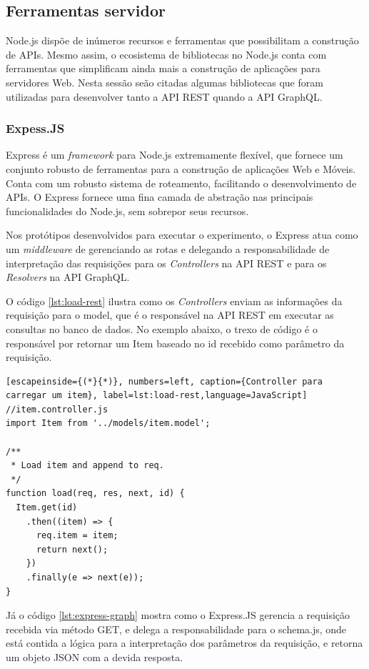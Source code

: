 \subsection{Ferramentas servidor}

Node.js dispõe de inúmeros recursos e ferramentas que possibilitam a construção de APIs. Mesmo assim, o ecosistema de bibliotecas no Node.js conta com ferramentas que simplificam ainda mais a construção de aplicações para servidores Web. Nesta sessão seão citadas algumas bibliotecas que foram utilizadas para desenvolver tanto a API REST quando a API GraphQL. 

\subsubsection*{Expess.JS}

Express é um \textit{framework} para Node.js extremamente flexível, que fornece um conjunto robusto de ferramentas para a construção de aplicações Web e Móveis. Conta com um robusto sistema de roteamento, facilitando o desenvolvimento de APIs. O Express fornece uma fina camada de abstração nas principais funcionalidades do Node.js, sem sobrepor seus recursos.

Nos protótipos desenvolvidos para executar o experimento, o Express atua como um \textit{middleware} de gerenciando as rotas e delegando a responsabilidade de interpretação das requisições para os \textit{Controllers} na API REST e para os \textit{Resolvers} na API GraphQL.

O código \ref{lst:load-rest} ilustra como os \textit{Controllers} enviam as informações da requisição para o model, que é o responsável na API REST em executar as consultas no banco de dados. No exemplo abaixo, o trexo de código é o responsável por retornar um \textup{Item} baseado no \textup{id} recebido como parâmetro da requisição.

\begin{lstlisting}[escapeinside={(*}{*)}, numbers=left, caption={Controller para carregar um item}, label=lst:load-rest,language=JavaScript]
//item.controller.js
import Item from '../models/item.model';

/**
 * Load item and append to req.
 */
function load(req, res, next, id) {
  Item.get(id)
    .then((item) => {
      req.item = item;
      return next();
    })
    .finally(e => next(e));
}

\end{lstlisting}

Já o código \ref{lst:express-graph} mostra como o Express.JS gerencia a requisição recebida via método GET, e delega a responsabilidade para o schema.js, onde está contida a lógica para a interpretação dos parâmetros da requisição, e retorna um objeto JSON com a devida resposta.

